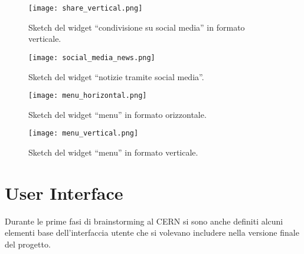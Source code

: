        	\begin{figure}[h!]
       		\begin{center}
       			\texttt{[image: share\_vertical.png]}
       		\end{center}
       		\caption[Sketch del widget ``condivisione su social media'' (verticale)]{Sketch del widget ``condivisione su social media'' in formato verticale.}
       		\label{fig:share_vertical}
       	\end{figure}
       	
       	\begin{figure}[h!]
       		\begin{center}
       			\texttt{[image: social\_media\_news.png]}
       		\end{center}
       		\caption[Sketch del widget ``notizie tramite social media'']{Sketch del widget ``notizie tramite social media''.}
       		\label{fig:social_media_news}
       	\end{figure}
       	
       	\begin{figure}[h!]
       		\begin{center}
       			\texttt{[image: menu\_horizontal.png]}
       		\end{center}
       		\caption[Sketch del widget ``menu'' (orizzontale)]{Sketch del widget ``menu'' in formato orizzontale.}
       		\label{fig:menu_horizontal}
       	\end{figure}
       	
       	\begin{figure}[h!]
       		\begin{center}
       			\texttt{[image: menu\_vertical.png]}
       		\end{center}
       		\caption[Sketch del widget ``menu'' (verticale)]{Sketch del widget ``menu'' in formato verticale.}
       		\label{fig:menu_vertical}
       	\end{figure}
       	
       	\FloatBarrier
       	
    \section{User Interface} \label{sec:ccp;user_interface}
    
        Durante le prime fasi di brainstorming al \ac{CERN} si sono anche definiti alcuni elementi base dell'interfaccia utente che si volevano includere nella versione finale del progetto.
        
